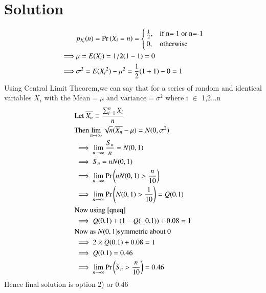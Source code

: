 \documentclass[journal,12pt,twocolumn]{IEEEtran}
\begin{document}
\section{Solution}
\begin{align}
   &p_{X_i} (n)=\Pr\left(X_i = n\right)=\nonumber \begin{cases}
            \frac{1}{2}, &\text{if n= 1 or n=-1}\\
             0, &\text{otherwise}\\
            \end{cases} \\ 
    \implies& \mu=E(X_i)=1/2(1-1)=0\\
    \implies& \sigma^2=E({X_i}^2) -\mu^2=\frac{1}{2}(1+1) -0=1
\end{align}
Using Central Limit Theorem,we can say that for a series of random and identical variables \(X_i\) with the \(\text{Mean} =\mu \text{ and variance}=\sigma^2  \)  where i \(\in\) {1,2...n} 
\begin{align}
&\text{Let }\overline{X_n} \equiv \frac{\sum_{i=1}^n X_i}{n}\\
&\text{Then} \lim_{n\to\infty}\sqrt{n}(\overline{X_n}-\mu)=N(0,\sigma^2)\\
&\implies\lim_{n\to\infty}\frac{S_n}{n}=N(0,1)\\
&\implies S_n=n N(0,1)\\
&\implies\lim_{n\to\infty}\Pr\left(n N(0,1) >\frac{n}{10}\right)\\
&\implies\lim_{n\to\infty} \Pr\left(N(0,1)>\frac{1}{10}\right)= Q(0.1)\\ \nonumber
&\text{Now using \eqref{qneq}}\\ 
&\implies Q(0.1)+(1-Q(-0.1))+ 0.08=1\\ \nonumber
&\text{Now as }N(0,1) \text{symmetric about 0}\\
&\implies 2\times Q(0.1)+0.08=1\\
&\implies Q(0.1)=0.46\\
&\implies \lim_{n\to\infty} \Pr\left(S_n >\frac{n}{10}\right)=0.46 
\end{align}
Hence final solution is option 2) or 0.46
\end{document}

